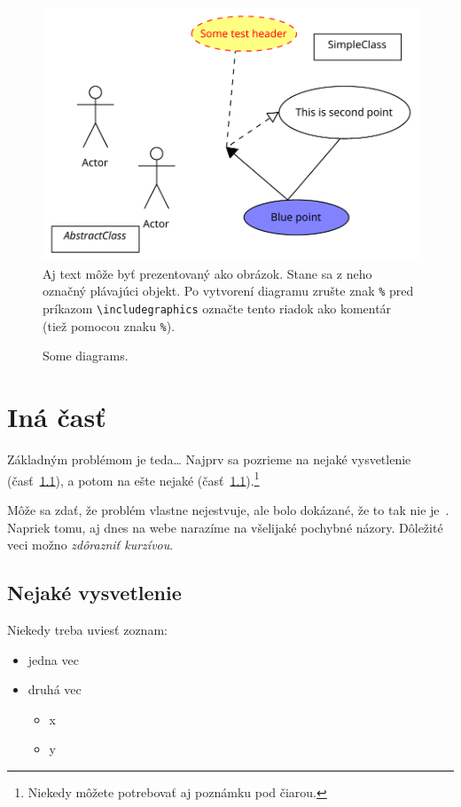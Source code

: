 \documentclass[10pt,twoside,a4paper,english]{article}
\begin{document}
	\begin{figure}[tbh]
		\centering
		\includegraphics[scale=0.7]{diagram_test.pdf}
		Aj text môže byť prezentovaný ako obrázok. Stane sa z neho označný plávajúci objekt. Po vytvorení diagramu zrušte znak \texttt{\%} pred príkazom \verb|\includegraphics| označte tento riadok ako komentár (tiež pomocou znaku \texttt{\%}).
		\caption{Some diagrams.}
		\label{f:rozhod}
	\end{figure}



	\section{Iná časť} \label{ina}

	Základným problémom je teda\ldots{} Najprv sa pozrieme na nejaké vysvetlenie (časť~\ref{ina:nejake}), a potom na ešte nejaké (časť~\ref{ina:nejake}).\footnote{Niekedy môžete potrebovať aj poznámku pod čiarou.}

	Môže sa zdať, že problém vlastne nejestvuje\cite{Coplien:MPD}, ale bolo dokázané, že to tak nie je~\cite{Czarnecki:Staged, Czarnecki:Progress}. Napriek tomu, aj dnes na webe narazíme na všelijaké pochybné názory\cite{PLP-Framework}. Dôležité veci možno \emph{zdôrazniť kurzívou}.


	\subsection{Nejaké vysvetlenie} \label{ina:nejake}

	Niekedy treba uviesť zoznam:

	\begin{itemize}
		\item jedna vec
		\item druhá vec
		\begin{itemize}
			\item x
			\item y
		\end{itemize}
	\end{itemize}
\end{document}
